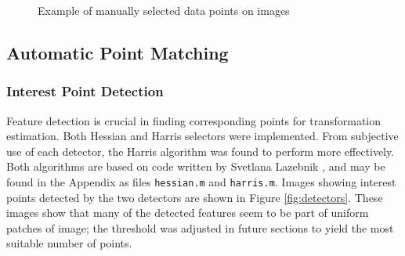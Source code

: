 \documentclass[a4paper, 10pt, conference]{ieeeconf}
\begin{document}
\begin{figure}[!ht]
	\caption{Example of manually selected data points on images}
    \vspace{-0.75cm}
  \label{fig:manual}
\end{figure}
\subsection{Automatic Point Matching }
\subsubsection{Interest Point Detection}

Feature detection is crucial in finding corresponding points for transformation estimation. Both Hessian and Harris selectors were implemented. From subjective use of each detector, the Harris algorithm was found to perform more effectively. Both algorithms are based on code written by Svetlana Lazebnik \cite{harrisdetector}, and may be found in the Appendix as files \texttt{hessian.m} and \texttt{harris.m}. Images showing interest points detected by the two detectors are shown in Figure \ref{fig:detectors}. These images show that many of the detected features seem to be part of uniform patches of image; the threshold was adjusted in future sections to yield the most suitable number of points.
\end{document}
